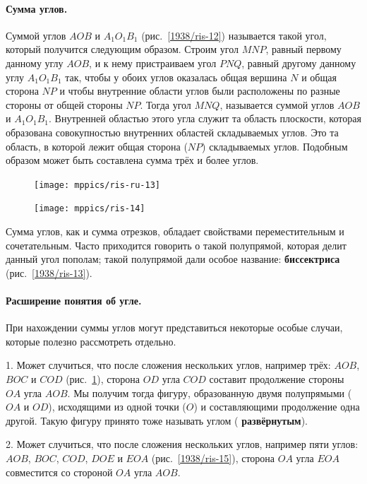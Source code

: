 \documentclass[twoside]{book}
\makeatletter
\newcommand{\rindex}[2][\imki@jobname]{%
  \index[#1]{\detokenize{#2}}%
}
\makeatother
\begin{document}
\paragraph{Сумма углов.}\label{1938/15}
Суммой углов $AOB$ и $A_1O_1B_1$ (рис.~\ref{1938/ris-12}) называется такой угол, который получится следующим образом.
Строим угол $MNP$, равный первому данному углу $AOB$, и к нему пристраиваем угол $PNQ$, равный другому данному углу $A_1O_1B_1$ так, чтобы у обоих углов оказалась общая вершина $N$ и общая сторона $NP$ и чтобы внутренние области углов были расположены по разные стороны от общей стороны $NP$.
Тогда угол $MNQ$, называется суммой углов $AOB$ и $A_1O_1B_1$.
Внутренней областью этого угла служит та область плоскости, которая образована совокупностью внутренних областей складываемых углов.
Это та область, в которой лежит общая сторона ($NP$) складываемых углов.
Подобным образом может быть составлена сумма трёх и более углов.

\begin{figure}
\centering
\texttt{[image: mppics/ris-ru-13]}
\caption{}\label{1938/ris-13}
\bigskip
\texttt{[image: mppics/ris-14]}
\caption{}\label{1938/ris-14}
\end{figure}

Сумма углов, как и сумма отрезков, обладает свойствами переместительным и сочетательным.
Часто приходится говорить о такой полупрямой, которая делит данный угол пополам;
такой полупрямой дали особое название:
\rindex{биссектриса}\textbf{биссектриса} (рис.~\ref{1938/ris-13}).


\paragraph{Расширение понятия об угле.}\label{1938/16}
При нахождении суммы углов могут представиться некоторые особые случаи, которые полезно рассмотреть отдельно.

1.
Может случиться, что после сложения нескольких углов, например трёх:
$AOB$, $BOC$ и $COD$ (рис.~\ref{1938/ris-14}), сторона $OD$ угла $COD$ составит продолжение стороны $OA$ угла $AOB$.
Мы получим тогда фигуру, образованную двумя полупрямыми ($OA$ и $OD$), исходящими из одной точки ($O$) и составляющими продолжение одна другой.
Такую фигуру принято тоже называть углом (\rindex{развёрнутый угол}\textbf{развёрнутым}).

2.
Может случиться, что после сложения нескольких углов, например пяти углов:
$AOB$, $BOC$, $COD$, $DOE$ и $EOA$ (рис.~\ref{1938/ris-15}), сторона $OA$ угла $EOA$ совместится со стороной $OA$ угла $AOB$.
\end{document}
